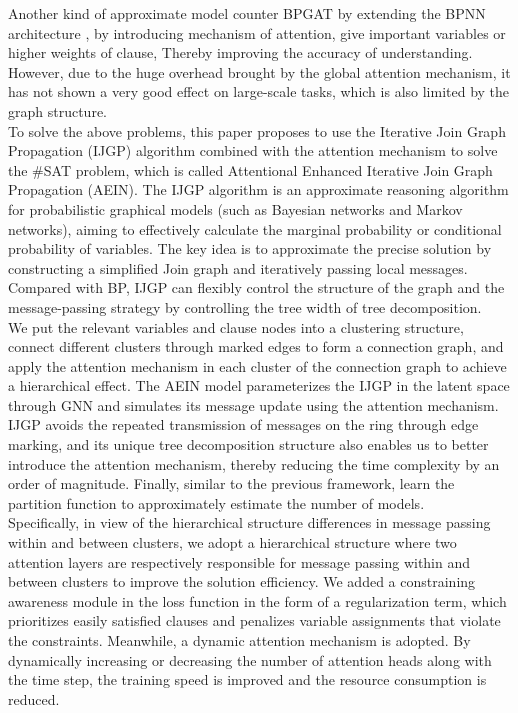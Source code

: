 Another kind of approximate model counter BPGAT \cite{DBLP:conf/esann/Saveri22} by extending the BPNN architecture
\cite{DBLP:conf/nips/KuckCTLSSE20}, by introducing mechanism of attention, give important variables or higher weights 
of clause, Thereby improving the accuracy of understanding. However, due to the huge overhead brought by the global 
attention mechanism, it has not shown a very good effect on large-scale tasks, which is also limited by the graph 
structure. \\

To solve the above problems, this paper proposes to use the Iterative Join Graph Propagation (IJGP)
\cite{DBLP:journals/corr/abs-1301-0564}algorithm combined with the attention mechanism to solve the \#SAT problem, 
which is called Attentional Enhanced Iterative Join Graph Propagation (AEIN). The IJGP algorithm is an approximate 
reasoning algorithm for probabilistic graphical models (such as Bayesian networks and Markov networks), aiming to 
effectively calculate the marginal probability or conditional probability of variables. The key idea is to approximate 
the precise solution by constructing a simplified Join graph and iteratively passing local messages. Compared with BP, 
IJGP can flexibly control the structure of the graph and the message-passing strategy by controlling the tree width of 
tree decomposition. \\

We put the relevant variables and clause nodes into a clustering structure, connect different clusters through marked 
edges to form a connection graph, and apply the attention mechanism in each cluster of the connection graph to achieve 
a hierarchical effect. The AEIN model parameterizes the IJGP in the latent space through GNN and simulates its message 
update using the attention mechanism. IJGP avoids the repeated transmission of messages on the ring through edge marking, 
and its unique tree decomposition structure also enables us to better introduce the attention mechanism, thereby reducing 
the time complexity by an order of magnitude. Finally, similar to the previous framework, learn the partition function to 
approximately estimate the number of models. \\

Specifically, in view of the hierarchical structure differences in message passing within and between clusters, we adopt 
a hierarchical structure where two attention layers are respectively responsible for message passing within and between 
clusters to improve the solution efficiency. We added a constraining awareness module in the loss function in the form of 
a regularization term, which prioritizes easily satisfied clauses and penalizes variable assignments that violate the constraints. 
Meanwhile, a dynamic attention mechanism is adopted. By dynamically increasing or decreasing the number of attention heads 
along with the time step, the training speed is improved and the resource consumption is reduced. \\

